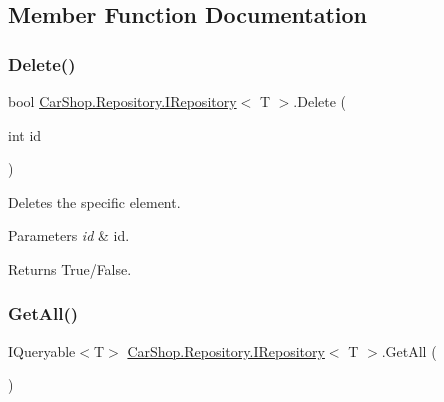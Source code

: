 \subsection{Member Function Documentation}
\mbox{\label{interface_car_shop_1_1_repository_1_1_i_repository_aeb1731dedbb0cb9d3e70d67e9b35f409}} 
\subsubsection{\texorpdfstring{Delete()}{Delete()}}
{\footnotesize\ttfamily bool \mbox{\hyperlink{interface_car_shop_1_1_repository_1_1_i_repository}{Car\+Shop.\+Repository.\+I\+Repository}}$<$ T $>$.Delete (\begin{DoxyParamCaption}\item[{int}]{id }\end{DoxyParamCaption})}



Deletes the specific element. 


\begin{DoxyParams}{Parameters}
{\em id} & id.\\
\hline
\end{DoxyParams}
\begin{DoxyReturn}{Returns}
True/\+False.
\end{DoxyReturn}
\mbox{\label{interface_car_shop_1_1_repository_1_1_i_repository_ac595c3fa4a5bcf55a3c0c56a61060d40}} 
\subsubsection{\texorpdfstring{Get\+All()}{GetAll()}}
{\footnotesize\ttfamily I\+Queryable$<$T$>$ \mbox{\hyperlink{interface_car_shop_1_1_repository_1_1_i_repository}{Car\+Shop.\+Repository.\+I\+Repository}}$<$ T $>$.Get\+All (\begin{DoxyParamCaption}{ }\end{DoxyParamCaption})}



